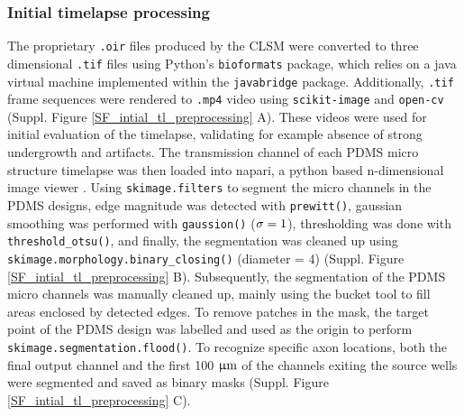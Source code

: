 \subsubsection{Initial timelapse processing}
The proprietary \verb|.oir| files produced by the CLSM were converted to three
dimensional \verb|.tif| files using Python's \verb|bioformats| package, which
relies on a java virtual machine implemented within the \verb|javabridge|
package. Additionally, \verb|.tif| frame sequences were rendered to \verb|.mp4|
video using \verb|scikit-image| and \verb|open-cv| (Suppl. Figure
\ref{SF_intial_tl_preprocessing} A). These videos were used for initial
evaluation of the timelapse, validating for example absence of strong
undergrowth and artifacts. The transmission channel of each PDMS micro structure
timelapse was then loaded into napari, a python based n-dimensional image viewer
\parencite{Sofroniew2021}. Using \verb|skimage.filters| to segment the micro
channels in the PDMS designs, edge magnitude was detected with \verb|prewitt()|,
gaussian smoothing was performed with \verb|gaussion()| ($\rm\sigma=1$),
thresholding was done with \verb|threshold_otsu()|, and finally, the
segmentation was cleaned up using \verb|skimage.morphology.binary_closing()|
(diameter = 4) (Suppl. Figure \ref{SF_intial_tl_preprocessing} B). Subsequently,
the segmentation of the PDMS micro channels was manually cleaned up, mainly
using the bucket tool to fill areas enclosed by detected edges. To remove
patches in the mask, the target point of the PDMS design was labelled and used
as the origin to perform \verb|skimage.segmentation.flood()|. To recognize
specific axon locations, both the final output channel and the first 100
$\rm\upmu m$ of the channels exiting the source wells were segmented and saved
as binary masks (Suppl. Figure \ref{SF_intial_tl_preprocessing} C).

